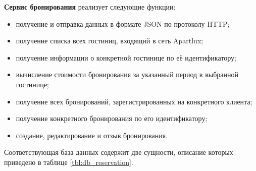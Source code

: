 \textbf{Сервис бронирования} реализует следующие функции:
\begin{itemize}
	\item получение и отправка данных в формате JSON по протоколу HTTP;
		
	\item получение списка всех гостиниц, входящий в сеть Apartlux;
	
	\item получение информации о конкретной гостинице по её идентификатору;
	
	\item вычисление стоимости бронирования за указанный период в выбранной гостинице;
	
	\item получение всех бронирований, зарегистрированных на конкретного клиента;
	
	\item получение конкретного бронирования по его идентификатору;
	
	\item создание, редактирование и отзыв бронирования.
\end{itemize}
Соответствующая база данных содержит две сущности, описание которых приведено в таблице \ref{tbl:db_reservation}.
